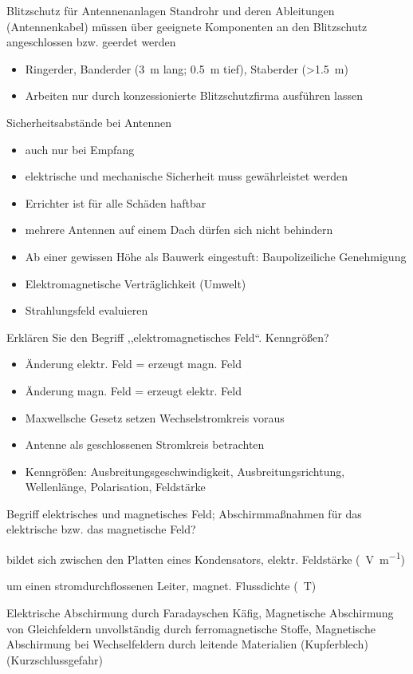 \documentclass[avery5371,grid,frame,a4paper]{flashcards}
\newcommand{\card}[3]{
  \begin{flashcard}[{\chap} -- #1]{#2}#3\end{flashcard}
}
\begin{document}
\card{83}{Blitzschutz für Antennenanlagen}{
  Standrohr und deren Ableitungen (Antennenkabel) müssen über geeignete Komponenten an den Blitzschutz angeschlossen bzw. geerdet werden

  \begin{itemize}
    \item Ringerder, Banderder (\SI{3}{\metre} lang; \SI{0,5}{\metre} tief), Staberder (>\SI{1,5}{\metre})
    \item Arbeiten nur durch konzessionierte Blitzschutzfirma ausführen lassen
  \end{itemize}
}
\card{84}{Sicherheitsabstände bei Antennen}{
  \small
  \begin{itemize}\itemsep0pt
    \item auch nur bei Empfang
    \item elektrische und mechanische Sicherheit muss gewährleistet werden
    \item Errichter ist für alle Schäden haftbar
    \item mehrere Antennen auf einem Dach dürfen sich nicht behindern
    \item Ab einer gewissen Höhe als Bauwerk eingestuft: Baupolizeiliche Genehmigung
    \item Elektromagnetische Verträglichkeit (Umwelt)
    \item Strahlungsfeld evaluieren
  \end{itemize}
}
\card{85}{Erklären Sie den Begriff ,,elektromagnetisches Feld``. Kenngrößen?}{
  \begin{itemize}\itemsep0pt
    \item Änderung elektr. Feld = erzeugt magn. Feld
    \item Änderung magn. Feld = erzeugt elektr. Feld
    \item Maxwellsche Gesetz setzen Wechselstromkreis voraus
    \item Antenne als geschlossenen Stromkreis betrachten
    \item Kenngrößen: Ausbreitungsgeschwindigkeit, Ausbreitungsrichtung, Wellenlänge, Polarisation, Feldstärke
  \end{itemize}
}
\card{86}{Begriff elektrisches und magnetisches Feld; Abschirmmaßnahmen für das elektrische bzw. das magnetische Feld?}{
  \begin{description}\itemsep0pt
    \item[elektrisches Feld] bildet sich zwischen den Platten eines Kondensators, elektr. Feldstärke (\SI{}{\volt\per\metre})
    \item[magnetisches Feld] um einen stromdurchflossenen Leiter, magnet. Flussdichte (\SI{}{\tesla})
    \item[Abschirmmaßnahmen]
      Elektrische Abschirmung durch Faradayschen Käfig,
      Magnetische Abschirmung von Gleichfeldern unvollständig durch ferromagnetische Stoffe,
      Magnetische Abschirmung bei Wechselfeldern durch leitende Materialien (Kupferblech) (Kurzschlussgefahr)
  \end{description}
}
\end{document}
